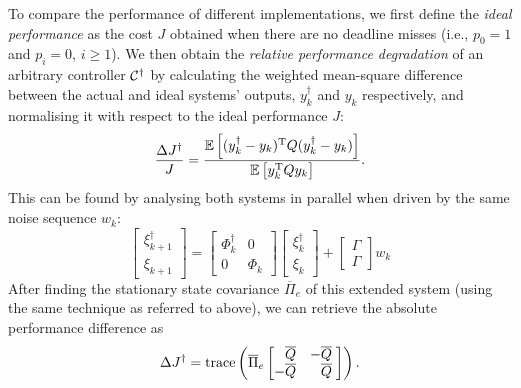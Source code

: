 To compare the performance of different implementations, we first define the \emph{ideal performance} as the cost $J$ obtained when there are no deadline misses (i.e., $p_0 = 1$ and $p_i = 0$, $i \geq 1$).
We then obtain the \emph{relative performance degradation} of an arbitrary controller $\mathcal{C}^{\dagger}$ by calculating the weighted mean-square difference between the actual and ideal systems' outputs, $y^{\dagger}_k$ and $y_k$ respectively, and normalising it with respect to the ideal performance $J$:
\begin{equation}
    \label{eq:relcost}
  \frac{\Delta J^{\dagger}}{J} = \frac{\E{ (y^{\dagger}_k - y_k)^{\T} Q (y^{\dagger}_k - y_k) }}{ \E{ y_k^{\T} Q y_k }}.
\end{equation}
This can be found by analysing both systems in parallel when driven by the same noise sequence $w_k$:
\begin{equation*}
    \begin{bmatrix}
    \xi_{k+1}^\dagger \\ \xi_{k+1}%
    \end{bmatrix} =
    \begin{bmatrix}
    \Phi_k^\dagger & 0 \\ 0 & \Phi_k%
    \end{bmatrix}
    \begin{bmatrix}
    \xi_k^\dagger \\ \xi_k%
    \end{bmatrix} +
    \begin{bmatrix}
    \Gamma \\ \Gamma
    \end{bmatrix} w_k
\end{equation*}
After finding the stationary state covariance $\overline{\Pi}_e$ of this extended system (using the same technique as referred to above), we can retrieve the absolute performance difference as
\begin{equation*}
    \label{eq:deltaJ}
 \Delta J^{\dagger} = \operatorname{trace} \funof{ \overline{\Pi}_e  \begin{bmatrix}
    \phantom{-}\overline{Q} & -\overline{Q}\phantom{,} \\
    -\overline{Q} & \phantom{-}\overline{Q}\phantom{,}
    \end{bmatrix} }.
\end{equation*}

